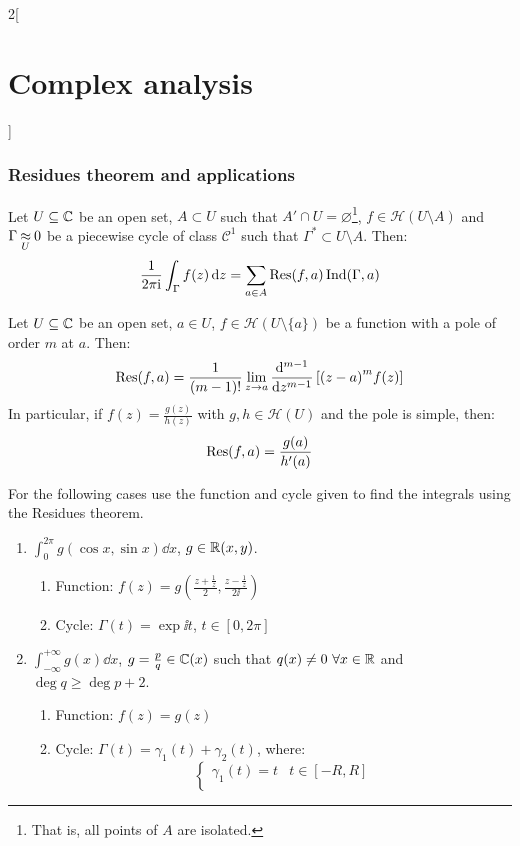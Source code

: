 \documentclass[../../../main_math.tex]{subfiles}
\begin{document}
\begin{multicols}{2}[\section{Complex analysis}]
  \subsubsection{Residues theorem and applications}
  \begin{theorem}
    Let $U\subseteq \CC$ be an open set, $A\subset U$ such that $A'\cap U=\varnothing$\footnote{That is, all points of $A$ are isolated.}, $f\in\mathcal{H}(U\setminus A)$ and $\Gamma\homoleg{U} 0$ be a piecewise cycle of class $\mathcal{C}^1$ such that $\Gamma^*\subset U\setminus A$. Then:
    $$\frac{1}{2\pi\ii}\int_{\Gamma}f(z)\dd{z}=\sum_{a\in A}\Res(f,a)\Ind(\Gamma,a)$$
  \end{theorem}
  \begin{proposition}
    Let $U\subseteq \CC$ be an open set, $a\in U$, $f\in\mathcal{H}(U\setminus\{a\})$ be a function with a pole of order $m$ at $a$. Then: $$\Res(f,a)=\frac{1}{(m-1)!}\lim_{z\to a}\dv[m-1]{}{z}\left[{(z-a)}^mf(z)\right]$$
    In particular, if $f(z)=\frac{g(z)}{h(z)}$ with $g,h\in\mathcal{H}(U)$ and the pole is simple, then: $$\Res(f,a)=\frac{g(a)}{h'(a)}$$
  \end{proposition}
  \begin{proposition}
    For the following cases use the function and cycle given to find the integrals using the Residues theorem.
    \begin{enumerate}
      \item $\displaystyle\int_0^{2\pi} g(\cos x,\sin x)\dd{x}$, $g\in\RR(x,y)$.
            \begin{enumerate}
              \item Function: $f(z)=g\left(\frac{z+\frac{1}{z}}{2},\frac{z-\frac{1}{z}}{2\ii}\right)$
              \item Cycle: $\Gamma(t)=\exp{\ii t}$, $t\in[0,2\pi]$
            \end{enumerate}
      \item $\displaystyle\int_{-\infty}^{+\infty} g(x)\dd{x}$, $g=\frac{p}{q}\in\CC(x)$ such that $q(x)\ne 0\ \forall x\in \RR$ and $\deg q\geq \deg p+2$.
            \begin{enumerate}
              \item Function: $f(z)=g(z)$
              \item Cycle: $\Gamma(t)=\gamma_1(t)+\gamma_2(t)$, where:
                    $$
                      \begin{cases}
                        \gamma_1(t)=t            & t\in[-R,R]  \\

\end{cases}$$
\end{enumerate}
\end{enumerate}
\end{proposition}
\end{multicols}
\end{document}
